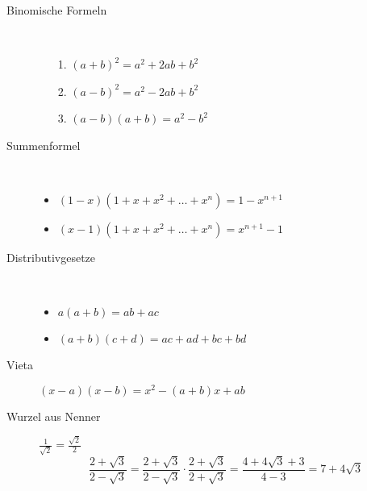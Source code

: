 \begin{description}
    \item[Binomische Formeln] \
    \begin{itemize}
        \item[1.] $(a+b)^2=a^2+2ab+b^2$
        \item[2.] $(a-b)^2=a^2-2ab+b^2$
        \item[3.] $(a-b)(a+b)=a^2-b^2$
    \end{itemize}
    \item[Summenformel] \
    \begin{itemize}
        \item $(1-x)(1+x+x^2+\dots +x^n)=1-x^{n+1}$
        \item $(x-1)(1+x+x^2+\dots +x^n)=x^{n+1}-1$
    \end{itemize}
    \item[Distributivgesetze] \
    \begin{itemize}
        \item $a(a+b)=ab+ac$
        \item $(a+b)(c+d) = ac +ad + bc +bd$
    \end{itemize}
    \item[Vieta] $(x-a)(x-b) = x^2 - (a+b)x+ab$
    \item[Wurzel aus Nenner] $\frac{1}{\sqrt{2}}=\frac{\sqrt{2}}{2}$
    \[\frac{2+\sqrt{3}}{2-\sqrt{3}}=\frac{2+\sqrt{3}}{2-\sqrt{3}} \cdot \frac{2+\sqrt{3}}{2+\sqrt{3}}=\frac{4+4\sqrt{3}+3}{4-3}=7+4\sqrt{3}\]
\end{description}
